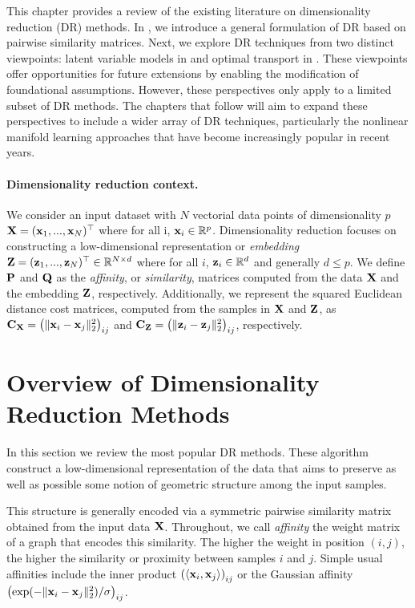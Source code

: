 \newpage

This chapter provides a review of the existing literature on dimensionality reduction (DR) methods. In , we introduce a general formulation of DR based on pairwise similarity matrices. Next, we explore DR techniques from two distinct viewpoints: latent variable models in  and optimal transport in . These viewpoints offer opportunities for future extensions by enabling the modification of foundational assumptions. However, these perspectives only apply to a limited subset of DR methods. The chapters that follow will aim to expand these perspectives to include a wider array of DR techniques, particularly the nonlinear manifold learning approaches that have become increasingly popular in recent years.


\paragraph{Dimensionality reduction context.}
We consider an input dataset with $N$ vectorial data points of dimensionality $p$ \ie ${\mathbf{X}} = ({\mathbf{x}}_1, ..., {\mathbf{x}}_N) ^\top$ where for all i, ${\mathbf{x}}_i \in \mathbb{R}^{p}$. Dimensionality reduction focuses on constructing a low-dimensional representation or \emph{embedding} ${\mathbf{Z}} = ({\mathbf{z}}_1, ..., {\mathbf{z}}_N)^\top \in \mathbb{R}^{N \times d}$ where for all $i$, ${\mathbf{z}}_i \in \mathbb{R}^{d}$ and generally $d \leq p$. We define ${\mathbf{P}}$ and ${\mathbf{Q}}$ as the \emph{affinity}, or \emph{similarity}, matrices computed from the data ${\mathbf{X}}$ and the embedding ${\mathbf{Z}}$, respectively. Additionally, we represent the squared Euclidean distance cost matrices, computed from the samples in ${\mathbf{X}}$ and ${\mathbf{Z}}$, as $\mathbf{C}_{\mathbf{X}} = \left(\|{\mathbf{x}}_{i}-{\mathbf{x}}_{j}\|_2^2\right)_{ij}$ and $\mathbf{C}_{\mathbf{Z}} = \left(\|{\mathbf{z}}_{i}-{\mathbf{z}}_{j}\|_2^2\right)_{ij}$, respectively.


\section{Overview of Dimensionality Reduction Methods}\label{sec:background_dr}

In this section we review the most popular DR methods. These algorithm construct a low-dimensional representation of the data that aims to preserve as well as possible some notion of geometric structure among the input samples. 

This structure is generally encoded via a symmetric pairwise similarity matrix obtained from the input data ${\mathbf{X}}$. Throughout, we call \emph{affinity} the weight matrix of a graph that encodes this similarity. The higher the weight in position $(i,j)$, the
higher the similarity or proximity between samples $i$ and $j$. Simple usual affinities include the inner product $\left( \langle {\mathbf{x}}_i, {\mathbf{x}}_j \rangle \right)_{ij}$ or the Gaussian affinity $\left( \exp(-\|{\mathbf{x}}_i - {\mathbf{x}}_j\|_2^2) / \sigma \right)_{ij}$.

